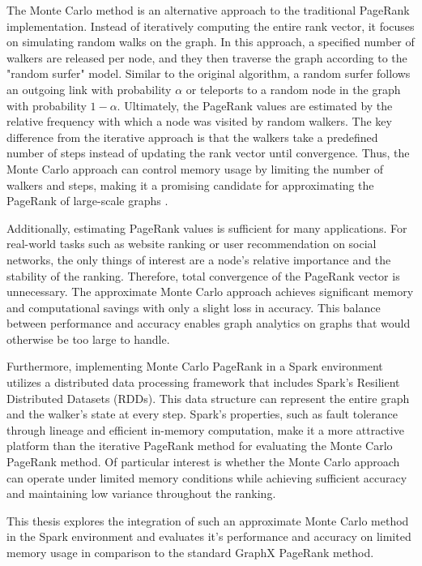 The Monte Carlo method is an alternative approach to the traditional PageRank implementation. Instead of iteratively computing the entire rank vector, it focuses on simulating random walks on the graph. In this approach, a specified number of walkers are released per node, and they then traverse the graph according to the "random surfer" model. Similar to the original algorithm, a random surfer follows an outgoing link with probability $\alpha$ or teleports to a random node in the graph with probability $1-\alpha$. Ultimately, the PageRank values are estimated by the relative frequency with which a node was visited by random walkers. The key difference from the iterative approach is that the walkers take a predefined number of steps instead of updating the rank vector until convergence. Thus, the Monte Carlo approach can control memory usage by limiting the number of walkers and steps, making it a promising candidate for approximating the PageRank of large-scale graphs \cite{avrachenkov_monte_2007}. \par
Additionally, estimating PageRank values is sufficient for many applications. For real-world tasks such as website ranking or user recommendation on social networks, the only things of interest are a node's relative importance and the stability of the ranking. Therefore, total convergence of the PageRank vector is unnecessary. The approximate Monte Carlo approach achieves significant memory and computational savings with only a slight loss in accuracy. This balance between performance and accuracy enables graph analytics on graphs that would otherwise be too large to handle.\par
Furthermore, implementing Monte Carlo PageRank in a Spark environment utilizes a distributed data processing framework that includes Spark's Resilient Distributed \allowbreak Datasets (RDDs). This data structure can represent the entire graph and the walker's state at every step. Spark's properties, such as fault tolerance through lineage and efficient in-memory computation, make it a more attractive platform than the iterative PageRank method for evaluating the Monte Carlo PageRank method. Of particular interest is whether the Monte Carlo approach can operate under limited memory conditions while achieving sufficient accuracy and maintaining low variance throughout the ranking. \par
This thesis explores the integration of such an approximate Monte Carlo method in the Spark environment and evaluates it's performance and accuracy on limited memory usage in comparison to the standard GraphX PageRank method.
 

